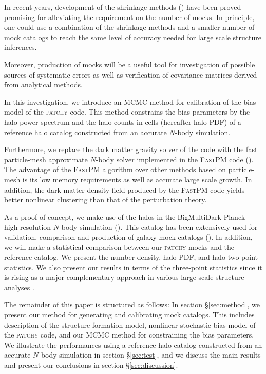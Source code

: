 \documentclass[english,usenatbib]{mn2e}
\begin{document}
In recent years, development of the shrinkage methods (\citealt{ledoit2004,pope2008,ledoit2012,joachimi2016,simpson2016}) have been proved promising for alleviating the requirement on the number of mocks. In principle, one could use a combination of the shrinkage methods and a smaller number of mock catalogs to reach the same level of accuracy needed for large scale structure inferences.    

Moreover, production of mocks will be a useful tool for investigation of possible sources of systematic errors as well as verification of covariance matrices derived from analytical methods.

In this investigation, we introduce an MCMC method for calibration of the bias model of the \textsc{patchy} code. This method constrains the bias parameters by the halo power spectrum and the halo counts-in-cells (hereafter halo PDF) of a  reference halo catalog constructed from an accurate $N$-body simulation. 

Furthermore, we replace the dark matter gravity solver of the code with the fast particle-mesh approximate $N$-body solver implemented in the \textsc{FastPM} code (\citealt{fastpm}). The advantage of the \textsc{FastPM} algorithm over other methods based on particle-mesh is its low memory requirements as well as accurate large scale growth. In addition, the dark matter density field produced by the \textsc{FastPM} code yields better nonlinear clustering than that of the perturbation theory. 

As a proof of concept, we make use of the halos in the BigMultiDark Planck high-resolution $N$-body simulation (\citealt{multidark}). This catalog has been extensively used for validation, comparison and production of galaxy mock catalogs (\citealt{chuang2015,zhao2015,kitaura2016,sergio2016}). 
In addition, we will make a statistical comparison between our \textsc{patchy} mocks and the reference catalog. We present the number density, halo PDF, and halo two-point statistics. 
We also present our results in terms of the three-point statistics since it is rising as a major complementary approach in various large-scale structure analyses \citep{slepian2015,gill2015a,gill2015b,guo2016,slepian2016a,slepian2016b,gill2017}. 


The remainder of this paper is structured as follows: In section \S \ref{sec:method}, we present our method for generating and calibrating mock catalogs. This includes description of the structure formation model, nonlinear stochastic bias model of the \textsc{patchy} code, and our MCMC method for constraining the bias parameters. We illustrate the performances using a reference halo catalog constructed from an accurate $N$-body simulation in section \S \ref{sec:test}, and we discuss the main results and present our conclusions in section \S \ref{sec:discussion}.
\end{document}
